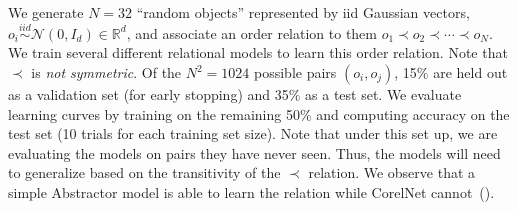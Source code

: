 We generate $N = 32$ ``random objects'' represented by iid Gaussian vectors, $o_i \overset{iid}{\sim} \mathcal{N}(0,
I_d) \in \mathbb{R}^d$, and associate an order relation to them $o_1 \prec o_2 \prec \cdots \prec o_N$. We train
several different relational models to learn this order relation. Note that $\prec$ is \textit{not symmetric}. Of the $N^2 = 1024$ possible pairs $(o_i, o_j)$, 15\% are held out as a validation set (for early stopping) and 35\% as a test set. We evaluate learning curves by training on the remaining 50\% and computing accuracy on the test set (10 trials for each training set size). Note that under this set up, we are evaluating the models on pairs they have never seen. Thus, the models will need to generalize based on the transitivity of the $\prec$ relation.
We observe that a simple Abstractor model is able to learn the relation while CorelNet cannot~().

